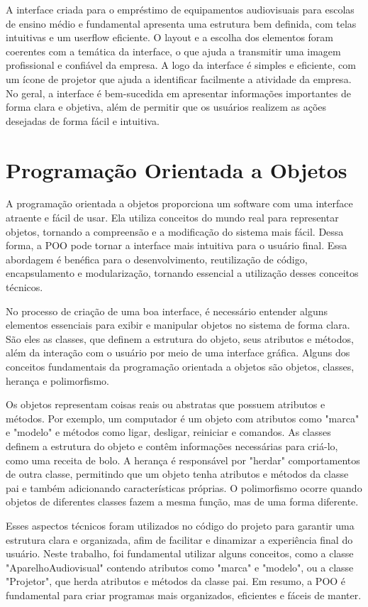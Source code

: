 \documentclass[
	12pt,				%
	openright,			%
	twoside,			%
	a4paper,			%
	english,			%
	french,				%
	spanish,			%
	brazil				%
	]{abntex2}
\begin{document}
A interface criada para o empréstimo de equipamentos audiovisuais para
escolas de ensino médio e fundamental apresenta uma estrutura bem definida, com
telas intuitivas e um userflow eficiente. O layout e a escolha dos elementos foram
coerentes com a temática da interface, o que ajuda a transmitir uma imagem
profissional e confiável da empresa. A logo da interface é simples e eficiente, com
um ícone de projetor que ajuda a identificar facilmente a atividade da empresa. No
geral, a interface é bem-sucedida em apresentar informações importantes de forma
clara e objetiva, além de permitir que os usuários realizem as ações desejadas de
forma fácil e intuitiva.


\chapter{Programação Orientada a Objetos}

A programação orientada a objetos proporciona um software com uma interface
atraente e fácil de usar. Ela utiliza conceitos do mundo real para representar
objetos, tornando a compreensão e a modificação do sistema mais fácil. Dessa
forma, a POO pode tornar a interface mais intuitiva para o usuário final. Essa
abordagem é benéfica para o desenvolvimento, reutilização de código,
encapsulamento e modularização, tornando essencial a utilização desses
conceitos técnicos.

No processo de criação de uma boa interface, é necessário entender alguns
elementos essenciais para exibir e manipular objetos no sistema de forma clara.
São eles as classes, que definem a estrutura do objeto, seus atributos e métodos,
além da interação com o usuário por meio de uma interface gráfica. Alguns dos
conceitos fundamentais da programação orientada a objetos são objetos, classes,
herança e polimorfismo.

Os objetos representam coisas reais ou abstratas que possuem atributos e
métodos. Por exemplo, um computador é um objeto com atributos como "marca"
e "modelo" e métodos como ligar, desligar, reiniciar e comandos. As classes
definem a estrutura do objeto e contêm informações necessárias para criá-lo,
como uma receita de bolo. A herança é responsável por "herdar" comportamentos
de outra classe, permitindo que um objeto tenha atributos e métodos da classe pai
e também adicionando características próprias. O polimorfismo ocorre quando
objetos de diferentes classes fazem a mesma função, mas de uma forma diferente.

Esses aspectos técnicos foram utilizados no código do projeto para garantir uma
estrutura clara e organizada, afim de facilitar e dinamizar a experiência final do
usuário. Neste trabalho, foi fundamental utilizar alguns conceitos, como a classe
"AparelhoAudiovisual" contendo atributos como "marca" e "modelo", ou a classe
"Projetor", que herda atributos e métodos da classe pai. Em resumo, a POO é
fundamental para criar programas mais organizados, eficientes e fáceis de manter.
\end{document}
